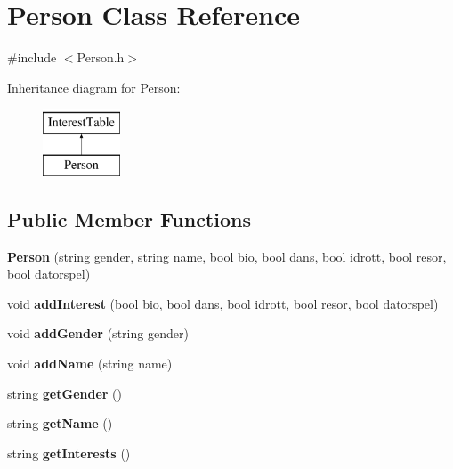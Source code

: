\hypertarget{class_person}{\section{Person Class Reference}
\label{class_person}
}


{\ttfamily \#include $<$Person.\-h$>$}

Inheritance diagram for Person\-:\begin{figure}[H]
\begin{center}
\leavevmode
\includegraphics[height=2.000000cm]{class_person}
\end{center}
\end{figure}
\subsection*{Public Member Functions}
\begin{DoxyCompactItemize}
\item 
\hypertarget{class_person_a01c24719ea1a9922d3584abd221fe45b}{{\bfseries Person} (string gender, string name, bool bio, bool dans, bool idrott, bool resor, bool datorspel)}\label{class_person_a01c24719ea1a9922d3584abd221fe45b}

\item 
\hypertarget{class_person_a2ce9b69c0710284f4a7d36e14bed1247}{void {\bfseries add\-Interest} (bool bio, bool dans, bool idrott, bool resor, bool datorspel)}\label{class_person_a2ce9b69c0710284f4a7d36e14bed1247}

\item 
\hypertarget{class_person_a39d2d988f68c77802702bc5af68b14ed}{void {\bfseries add\-Gender} (string gender)}\label{class_person_a39d2d988f68c77802702bc5af68b14ed}

\item 
\hypertarget{class_person_aa87d47d8fa5601292dd3e449963eac60}{void {\bfseries add\-Name} (string name)}\label{class_person_aa87d47d8fa5601292dd3e449963eac60}

\item 
\hypertarget{class_person_a66e13299dd684b80e7f8a9303c751ad5}{string {\bfseries get\-Gender} ()}\label{class_person_a66e13299dd684b80e7f8a9303c751ad5}

\item 
\hypertarget{class_person_a1f98501a519ee5d44f53a6d6423ae67b}{string {\bfseries get\-Name} ()}\label{class_person_a1f98501a519ee5d44f53a6d6423ae67b}

\item 
\hypertarget{class_person_a261cf774542cffd19f47583e6d503998}{string {\bfseries get\-Interests} ()}\label{class_person_a261cf774542cffd19f47583e6d503998}

\end{DoxyCompactItemize}
